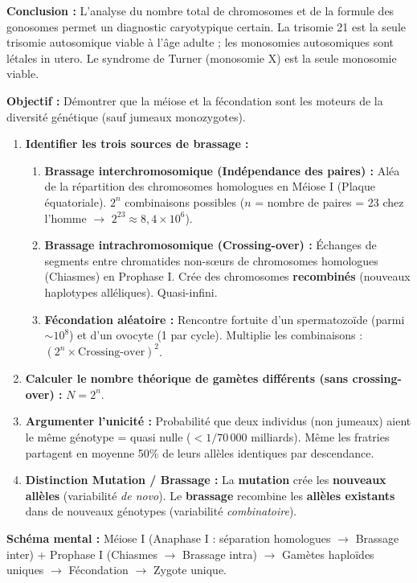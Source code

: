 \documentclass[11pt]{article}
\begin{document}
\begin{exoresolu}
\begin{center}
\begin{tabularx}{\linewidth}{|l|X|X|X|}
    \end{tabularx}
    \end{center}
    \textbf{Conclusion :} L'analyse du nombre total de chromosomes et de la formule des gonosomes permet un diagnostic caryotypique certain. La trisomie 21 est la seule trisomie autosomique viable à l'âge adulte ; les monosomies autosomiques sont létales in utero. Le syndrome de Turner (monosomie X) est la seule monosomie viable.
\end{exoresolu}

\begin{methode}
    \textbf{Objectif :} Démontrer que la méiose et la fécondation sont les moteurs de la diversité génétique (sauf jumeaux monozygotes).
    \begin{enumerate}
        \item \textbf{Identifier les trois sources de brassage :}
              \begin{enumerate}
                  \item \textbf{Brassage interchromosomique (Indépendance des paires) :} Aléa de la répartition des chromosomes homologues en Méiose I (Plaque équatoriale). $2^n$ combinaisons possibles ($n$ = nombre de paires = 23 chez l'homme $\rightarrow$ $2^{23} \approx 8,4 \times 10^6$).
                  \item \textbf{Brassage intrachromosomique (Crossing-over) :} Échanges de segments entre chromatides non-sœurs de chromosomes homologues (Chiasmes) en Prophase I. Crée des chromosomes \textbf{recombinés} (nouveaux haplotypes alléliques). Quasi-infini.
                  \item \textbf{Fécondation aléatoire :} Rencontre fortuite d'un spermatozoïde (parmi $\sim 10^8$) et d'un ovocyte (1 par cycle). Multiplie les combinaisons : $(2^n \times \text{Crossing-over})^2$.
              \end{enumerate}
        \item \textbf{Calculer le nombre théorique de gamètes différents (sans crossing-over) :} $N = 2^n$.
        \item \textbf{Argumenter l'unicité :} Probabilité que deux individus (non jumeaux) aient le même génotype = quasi nulle ($< 1/70\,000$ milliards). Même les fratries partagent en moyenne 50\% de leurs allèles identiques par descendance.
        \item \textbf{Distinction Mutation / Brassage :} La \textbf{mutation} crée les \textbf{nouveaux allèles} (variabilité \emph{de novo}). Le \textbf{brassage} recombine les \textbf{allèles existants} dans de nouveaux génotypes (variabilité \emph{combinatoire}).
    \end{enumerate}
    \textbf{Schéma mental :} Méiose I (Anaphase I : séparation homologues $\rightarrow$ Brassage inter) + Prophase I (Chiasmes $\rightarrow$ Brassage intra) $\rightarrow$ Gamètes haploïdes uniques $\rightarrow$ Fécondation $\rightarrow$ Zygote unique.
\end{methode}
\end{document}
